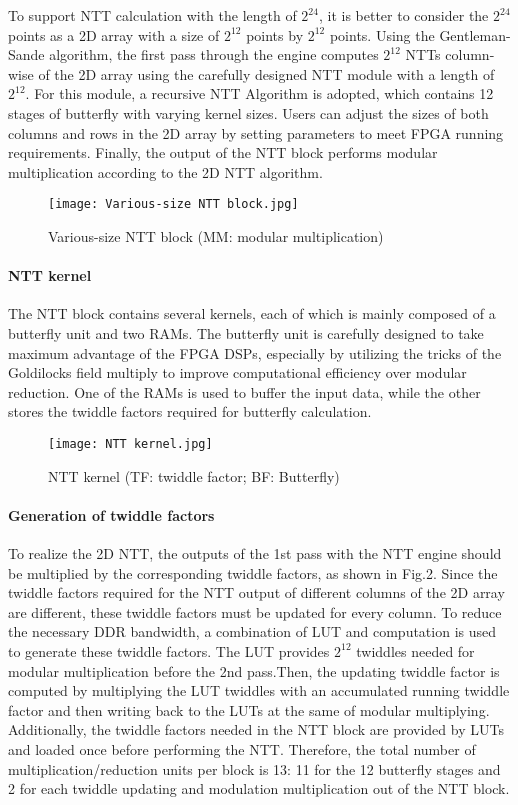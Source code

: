 To support NTT calculation with the length of $2^{24}$, it is better to consider the $2^{24}$ points as a 2D array with a size of $2^{12}$ points by $2^{12}$ points. Using the Gentleman-Sande algorithm, the first pass through the engine computes $2^{12}$ NTTs column-wise of the 2D array using the carefully designed NTT module with a length of $2^{12}$. For this module, a recursive NTT Algorithm is adopted, which contains 12 stages of butterfly with varying kernel sizes. Users can adjust the sizes of both columns and rows in the 2D array by setting parameters to meet FPGA running requirements. Finally, the output of the NTT block performs modular multiplication according to the 2D NTT algorithm.

\begin{figure}[ht]
  \centering
  \texttt{[image: Various-size NTT block.jpg]}
  \caption{Various-size NTT block (MM: modular multiplication)}
  \label{fig:NTT_module}
\end{figure}

\paragraph{NTT kernel}
The NTT block contains several kernels, each of which is mainly composed of a butterfly unit and two RAMs. The butterfly unit is carefully designed to take maximum advantage of the FPGA DSPs, especially by utilizing the tricks of the Goldilocks field multiply to improve computational efficiency over modular reduction. One of the RAMs is used to buffer the input data, while the other stores the twiddle factors required for butterfly calculation.


\begin{figure}[ht]
  \centering
  \texttt{[image: NTT kernel.jpg]}
  \caption{NTT kernel (TF: twiddle factor; BF: Butterfly)}
  \label{fig:NTT_kernel}
\end{figure}

\paragraph{Generation of twiddle factors}

To realize the 2D NTT, the outputs of the 1st pass with the NTT engine should be multiplied by the corresponding twiddle factors, as shown in Fig.2. Since the twiddle factors required for the NTT output of different columns of the 2D array are different, these twiddle factors must be updated for every column. To reduce the necessary DDR bandwidth, a combination of LUT and computation is used to generate these twiddle factors. The LUT provides  $2^{12}$ twiddles needed for modular multiplication before the 2nd pass.Then, the updating twiddle factor is computed by multiplying the LUT twiddles with an accumulated running twiddle factor and then writing back to the LUTs at the same of modular multiplying. Additionally, the twiddle factors needed in the NTT block are provided by LUTs and loaded once before performing the NTT. Therefore, the total number of multiplication/reduction units per block is 13: 11 for the 12 butterfly stages and 2 for each twiddle updating and modulation multiplication out of the NTT block.

